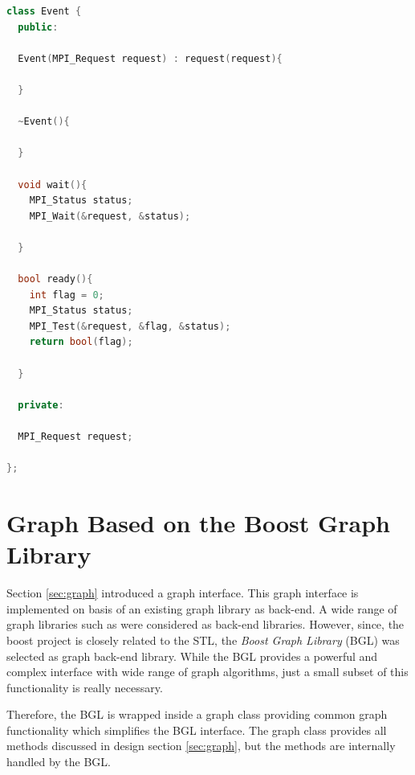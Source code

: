 \begin{lstlisting}[language=C++, label=lst:mpi_event]
class Event {
  public:

  Event(MPI_Request request) : request(request){
    
  }
  
  ~Event(){
    
  }

  void wait(){
    MPI_Status status;
    MPI_Wait(&request, &status);
    
  }

  bool ready(){
    int flag = 0;
    MPI_Status status;
    MPI_Test(&request, &flag, &status);
    return bool(flag);
    
  }
  
  private:
  
  MPI_Request request;
  
};  
\end{lstlisting}

\section{Graph Based on the Boost Graph Library}
\label{sec:impl:graph}
Section \ref{sec:graph} introduced a graph interface.  This graph
interface is implemented on basis of an existing graph library as
back-end. A wide range of graph libraries such as \cite{ref:lemon,
  ref:boost_bgl, ref:igraph, ref:ogdf} were considered as back-end
libraries.  However, since, the boost project is closely related to
the STL, the \emph{Boost Graph Library} \cite{ref:boost_bgl} (BGL) was
selected as graph back-end library.  While the BGL provides a powerful
and complex interface with wide range of graph algorithms, just a small subset of
this functionality is really necessary.

Therefore, the BGL is wrapped inside a graph class providing common
graph functionality which simplifies the BGL interface.  The graph
class provides all methods discussed in design section
\ref{sec:graph}, but the methods are internally handled by the BGL.


